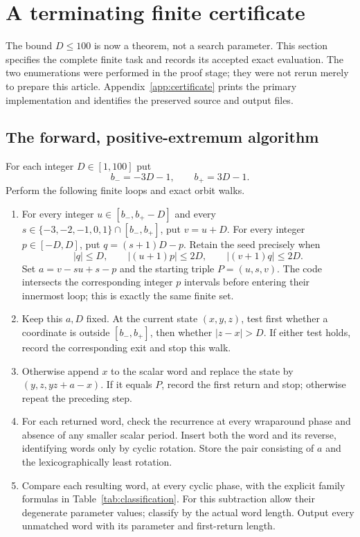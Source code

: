 \section{A terminating finite certificate}
\label{sec:finite}

The bound $D\le100$ is now a theorem, not a search parameter.
This section specifies the complete finite task and records its
accepted exact evaluation. The two enumerations were performed in
the proof stage; they were not rerun merely to prepare this article.
Appendix~\ref{app:certificate} prints the primary implementation
and identifies the preserved source and output files.

\subsection{The forward, positive-extremum algorithm}
For each integer $D\in[1,100]$ put
\[
 b_-=-3D-1,\qquad b_+=3D-1.
\]
Perform the following finite loops and exact orbit walks.
\begin{enumerate}
\item For every integer $u\in[b_-,b_+-D]$ and every
$s\in\{-3,-2,-1,0,1\}\cap[b_-,b_+]$, put $v=u+D$.
For every integer $p\in[-D,D]$, put $q=(s+1)D-p$.
Retain the seed precisely when
\begin{equation}
 |q|\le D,\qquad |(u+1)p|\le2D,\qquad
 |(v+1)q|\le2D.
 \label{eq:seedbounds}
\end{equation}
Set $a=v-su+s-p$ and the starting triple $P=(u,s,v)$.
The code intersects the corresponding integer $p$ intervals
before entering their innermost loop; this is exactly the same
finite set.
\item Keep this $a,D$ fixed. At the current state $(x,y,z)$,
test first whether a coordinate is outside $[b_-,b_+]$,
then whether $|z-x|>D$. If either test holds, record the
corresponding exit and stop this walk.
\item Otherwise append $x$ to the scalar word and replace the
state by $(y,z,yz+a-x)$. If it equals $P$, record the first
return and stop; otherwise repeat the preceding step.
\item For each returned word, check the recurrence at every
wraparound phase and absence of any smaller scalar period.
Insert both the word and its reverse, identifying words only
by cyclic rotation. Store the pair consisting of $a$ and the
lexicographically least rotation.
\item Compare each resulting word, at every cyclic phase, with
the explicit family formulas in Table~\ref{tab:classification}.
For this subtraction allow their degenerate parameter values;
classify by the actual word length. Output every unmatched word
with its parameter and first-return length.
\end{enumerate}

